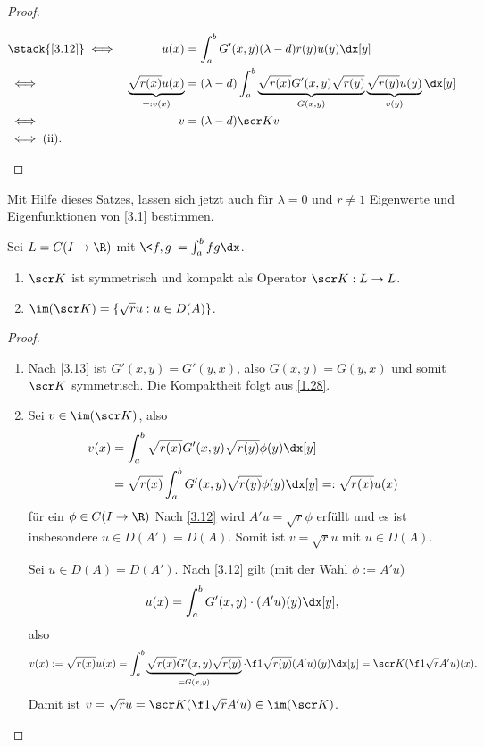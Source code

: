 \begin{st}
\begin{proof}
\begin{enumerate}[1)]
\begin{alignat*}{2}
					&\stack{\ref{3.12}}\iff& u(x) &= \int_a^b G'(x,y) (\lambda -d) r(y) u(y) \dx[y] \\
					&\iff& \underbrace{\sqrt{r(x)} u(x)}_{=:v(x)} &= (\lambda - d) \int_a^b \underbrace{\sqrt{r(x)} G'(x,y) \sqrt{r(y)}}_{G(x,y)} \underbrace{\sqrt{r(y)} u(y)}_{v(y)} \dx[y] \\
					&\iff& v &= (\lambda -d) \scr K v \\
					&\iff \text{(ii).}&&
				\end{alignat*}
		\end{enumerate}
	\end{proof}
	\begin{note}
		Mit Hilfe dieses Satzes, lassen sich jetzt auch für $\lambda = 0$ und $r \neq 1$ Eigenwerte und Eigenfunktionen von \eqref{3.1} bestimmen.
	\end{note}
\end{st}

\begin{lem} \label{3.18}
	Sei $L = C(I \to \R)$ mit $\<f,g\> = \int_a^b fg \dx$.
	\begin{enumerate}[1)]
		\item
			$\scr K$ ist symmetrisch und kompakt als Operator $\scr K : L \to L$.
		\item
			$\im(\scr K) = \{\sqrt{r} u : u \in D(A)\}$.
	\end{enumerate}
	\begin{proof}
		\begin{enumerate}[1)]
			\item
				Nach \ref{3.13} ist $G'(x,y) = G'(y,x)$, also $G(x,y) = G(y,x)$ und somit $\scr K$ symmetrisch.
				Die Kompaktheit folgt aus \ref{1.28}.
			\item
				\begin{segnb}[„$\subset$“]
					Sei $v \in \im(\scr K)$, also
					\begin{align*}
						v(x)
						&= \int_a^b \sqrt{r(x)} G'(x,y) \sqrt{r(y)} \phi(y) \dx[y] \\
						&= \sqrt{r(x)} \int_a^b G'(x,y) \sqrt{r(y)} \phi(y) \dx[y] =: \sqrt{r(x)} u(x)
					\end{align*}
					für ein $\phi \in C(I \to \R)$
					Nach \ref{3.12} wird $A'u= \sqrt{r} \phi$ erfüllt und es ist insbesondere $u \in  D(A') = D(A)$.
					Somit ist $v = \sqrt{r} u$ mit $u \in D(A)$.
				\end{segnb}
				\begin{segnb}[„$\supset$“]
					Sei $u \in D(A) = D(A')$.
					Nach \ref{3.12} gilt (mit der Wahl $\phi := A'u$)
					\[
						u(x) = \int_a^b G'(x,y) \cdot (A'u)(y) \dx[y],
					\]
					also
					\begin{align*}
						v(x)
						:= \sqrt{r(x)} u(x)
						= \int_a^b \underbrace{\sqrt{r(x)}G'(x,y)\sqrt{r(y)}}_{=G(x,y)} \cdot \f 1{\sqrt{r(y)}} (A'u)(y) \dx[y]
						= \scr K (\f 1{\sqrt{r}} A'u)(x).
					\end{align*}
					Damit ist $v = \sqrt r u = \scr K(\f 1{\sqrt r} A'u) \in \im(\scr K)$.
				\end{segnb}
		\end{enumerate}
	\end{proof}
\end{lem}

